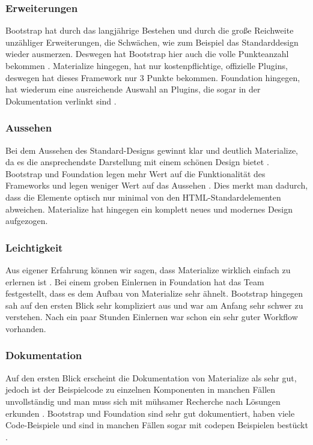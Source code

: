 \subsubsection{Erweiterungen}
\label{chapter:study-frontend-vergleich-erweiterungen}
Bootstrap hat durch das langjährige Bestehen und durch die große Reichweite unzähliger Erweiterungen, die Schwächen, wie zum Beispiel das Standarddesign wieder ausmerzen. Deswegen hat Bootstrap hier auch die volle Punkteanzahl bekommen \cite{introduction-bootstrap}. Materialize hingegen, hat nur kostenpflichtige, offizielle Plugins, deswegen hat dieses Framework nur 3 Punkte bekommen. Foundation hingegen, hat wiederum eine ausreichende Auswahl an Plugins, die sogar in der Dokumentation verlinkt sind \cite{foundation-webdocu}. 
\subsubsection{Aussehen}
\label{chapter:study-frontend-vergleich-aussehen}
Bei dem Aussehen des Standard-Designs gewinnt klar und deutlich Materialize, da es die ansprechendste Darstellung mit einem schönen Design bietet \cite{WebDocMaterialize}. Bootstrap und Foundation legen mehr Wert auf die Funktionalität des Frameworks und legen weniger Wert auf das Aussehen \cite{bootstrap-docu, foundation-webdocu}. Dies merkt man dadurch, dass die Elemente optisch nur minimal von den HTML-Standardelementen abweichen. Materialize hat hingegen ein komplett neues und modernes Design aufgezogen.
\subsubsection{Leichtigkeit}
\label{chapter:study-frontend-vergleich-leichtigkeit}
Aus eigener Erfahrung können wir sagen, dass Materialize wirklich einfach zu erlernen ist \cite{WebDocMaterialize}. Bei einem groben Einlernen in Foundation hat das Team festgestellt, dass es dem Aufbau von Materialize sehr ähnelt. Bootstrap hingegen sah auf den ersten Blick sehr kompliziert aus und war am Anfang sehr schwer zu verstehen. Nach ein paar Stunden Einlernen war schon ein sehr guter Workflow vorhanden.
\subsubsection{Dokumentation}
\label{chapter:study-frontend-vergleich-doku}
Auf den ersten Blick erscheint die Dokumentation von Materialize als sehr gut, jedoch ist der Beispielcode zu einzelnen Komponenten in manchen Fällen unvollständig und man muss sich mit mühsamer Recherche nach Lösungen erkunden \cite{WebDocMaterialize}. Bootstrap und Foundation sind sehr gut dokumentiert, haben viele Code-Beispiele und sind in manchen Fällen sogar mit \Gls{codepen} Beispielen bestückt \cite{bootstrap-docu, foundation-webdocu}.

